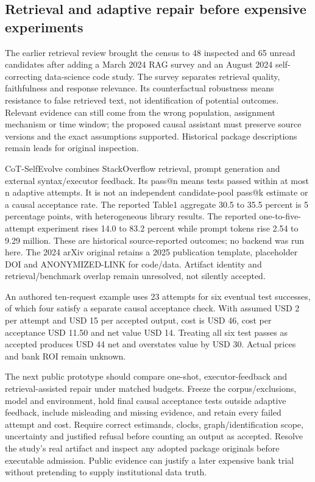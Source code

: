 \hypertarget{retrieval-and-adaptive-repair-before-expensive-experiments}{%
\subsection{Retrieval and adaptive repair before expensive
experiments}\label{retrieval-and-adaptive-repair-before-expensive-experiments}}

The earlier retrieval review brought the census to 48 inspected and 65
unread candidates after adding a March 2024 RAG survey and an August
2024 self-correcting data-science code study. The survey separates
retrieval quality, faithfulness and response relevance. Its
counterfactual robustness means resistance to false retrieved text, not
identification of potential outcomes. Relevant evidence can still come
from the wrong population, assignment mechanism or time window; the
proposed causal assistant must preserve source versions and the exact
assumptions supported. Historical package descriptions remain leads for
original inspection. \citep{exec19_rag_survey}

CoT-SelfEvolve combines StackOverflow retrieval, prompt generation and
external syntax/executor feedback. Its pass@n means tests passed within
at most n adaptive attempts. It is not an independent candidate-pool
pass@k estimate or a causal acceptance rate. The reported Table1
aggregate 30.5 to 35.5 percent is 5 percentage points, with
heterogeneous library results. The reported one-to-five-attempt
experiment rises 14.0 to 83.2 percent while prompt tokens rise 2.54 to
9.29 million. These are historical source-reported outcomes; no backend
was run here. The 2024 arXiv original retains a 2025 publication
template, placeholder DOI and ANONYMIZED-LINK for code/data. Artifact
identity and retrieval/benchmark overlap remain unresolved, not silently
accepted. \citep{exec19_selfcorrection_study}

An authored ten-request example uses 23 attempts for six eventual test
successes, of which four satisfy a separate causal acceptance check.
With assumed USD 2 per attempt and USD 15 per accepted output, cost is
USD 46, cost per acceptance USD 11.50 and net value USD 14. Treating all
six test passes as accepted produces USD 44 net and overstates value by
USD 30. Actual prices and bank ROI remain unknown.
\citep{exec19_retrieval_repair_reference}

The next public prototype should compare one-shot, executor-feedback and
retrieval-assisted repair under matched budgets. Freeze the
corpus/exclusions, model and environment, hold final causal acceptance
tests outside adaptive feedback, include misleading and missing
evidence, and retain every failed attempt and cost. Require correct
estimands, clocks, graph/identification scope, uncertainty and justified
refusal before counting an output as accepted. Resolve the study's real
artifact and inspect any adopted package originals before executable
admission. Public evidence can justify a later expensive bank trial
without pretending to supply institutional data truth.
\citep{exec19_rag_survey,exec19_selfcorrection_study,exec19_retrieval_repair_reference}

